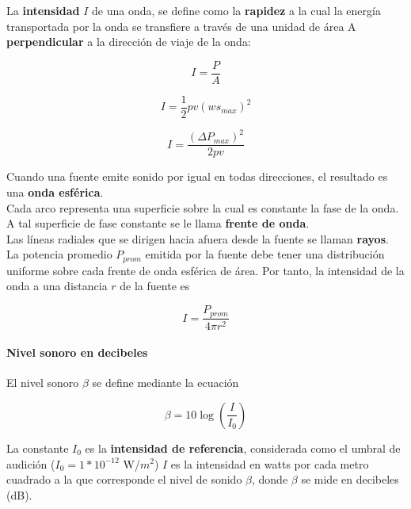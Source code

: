 \documentclass[10pt]{article}
\begin{document}
La \textbf{intensidad} $I$ de una onda, se define como la
\textbf{rapidez} a la cual la energía transportada por la onda se transfiere a través de una unidad
de área A \textbf{perpendicular} a la dirección de viaje de la onda:

\begin{equation*}
	I = \dfrac{P}{A}
\end{equation*}

\begin{equation*}
	I = \dfrac{1}{2} pv(ws_{max})^2
\end{equation*}

\begin{equation*}
	I = \dfrac{(\Delta P_{max})^2}{2pv}
\end{equation*}

Cuando una fuente emite sonido por igual en todas
direcciones, el resultado es una \textbf{onda esférica}.\\
Cada arco representa
una superficie sobre la cual es constante la fase de la onda. A tal superficie 
de fase constante se le llama \textbf{frente de onda}.\\
Las líneas radiales que se dirigen hacia
afuera desde la fuente se llaman \textbf{rayos}.\\
\linebreak
La potencia promedio $P_{prom}$ emitida por la fuente debe tener una distribución uniforme sobre cada frente de onda esférica de área. Por tanto, la intensidad de la onda a
una distancia $r$ de la fuente es

\begin{equation*}
	I = \dfrac{P_{prom}}{4\pi r^2}
\end{equation*}

\paragraph{Nivel sonoro en decibeles}

El nivel sonoro $\beta$ se define mediante la ecuación

\begin{equation*}
	\beta = 10 \log \left( \dfrac{I}{I_0} \right)
\end{equation*}

La constante $I_0$ es la \textbf{intensidad de referencia}, considerada como el umbral de audición
($I_0 = 1 * 10^{-12}$ W/$m^2$) $I$ es la intensidad en watts por cada metro cuadrado a la 
que corresponde el nivel de sonido $\beta$, donde $\beta$ se mide en decibeles (dB).
\end{document}

